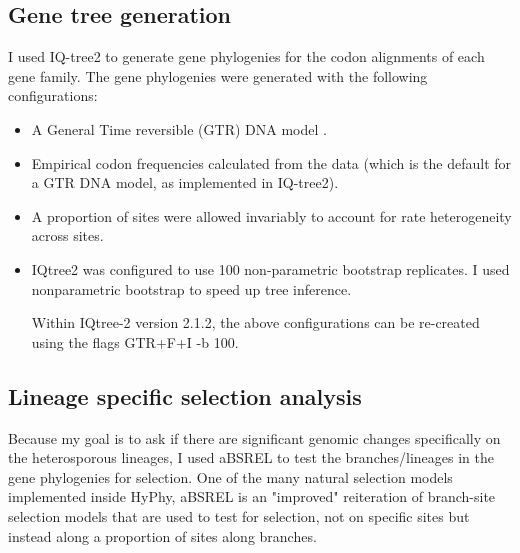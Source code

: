 \subsection{Gene tree generation}
I used IQ-tree2 \cite{Minh2020-dd} to generate gene phylogenies for the codon alignments of each gene family. The gene phylogenies were generated with the following configurations:
\begin{itemize}

	\item A General Time reversible (GTR) DNA model \cite{Tavare1986-li}.
	\item Empirical codon frequencies calculated from the data  (which is the default for a GTR DNA model, as implemented in IQ-tree2).
	\item A proportion of sites were allowed invariably to account for rate heterogeneity across sites. 
	\item IQtree2 was configured to use 100 non-parametric bootstrap replicates. I used nonparametric bootstrap to speed up tree inference.

Within IQtree-2 version 2.1.2, the above configurations can be re-created using the flags GTR+F+I -b 100.
\end{itemize}

\subsection{Lineage specific selection analysis}

Because my goal is to ask if there are significant genomic changes specifically on the heterosporous lineages, I used aBSREL\cite{Smith2015-qp} to test the branches/lineages in the gene phylogenies for selection. One of the many natural selection models implemented inside HyPhy, aBSREL is an "improved" reiteration of branch-site selection models that are used to test for selection, not on specific sites but instead along a proportion of sites along branches.